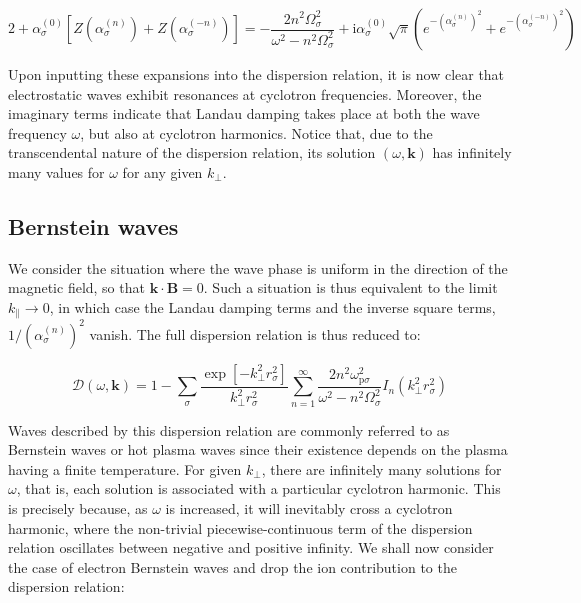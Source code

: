 \begin{equation}
    2+\alpha_\sigma^{(0)}\left[Z\left(\alpha_\sigma^{(n)}\right)+Z\left(\alpha_\sigma^{(-n)}\right)\right]=-\frac{2n^2\Omega_\sigma^2}{\omega^2-n^2\Omega_\sigma^2}+\mathrm{i}\alpha_\sigma^{(0)}\sqrt{\pi}\left(e^{-\left(\alpha_\sigma^{(n)}\right)^2}+e^{-\left(\alpha_\sigma^{(-n)}\right)^2}\right)
\end{equation}

Upon inputting these expansions into the dispersion relation, it is now clear that electrostatic waves exhibit resonances at cyclotron frequencies. Moreover, the imaginary terms indicate that Landau damping takes place at both the wave frequency $\omega$, but also at cyclotron harmonics. Notice that, due to the transcendental nature of the dispersion relation, its solution $(\omega,\mathbf{k})$ has infinitely many values for $\omega$ for any given $k_\perp$.

\subsection{Bernstein waves}

We consider the situation where the wave phase is uniform in the direction of the magnetic field, so that $\mathbf{k}\cdot\mathbf{B}=0$. Such a situation is thus equivalent to the limit $k_\parallel\to0$, in which case the Landau damping terms and the inverse square terms, $1/(\alpha_\sigma^{(n)})^2$ vanish. The full dispersion relation is thus reduced to:

\begin{equation}
    \mathcal{D}(\omega,\mathbf{k})=1-\sum_{\sigma}\frac{\exp{\left[-k_\perp^2r_\sigma^2\right]}}{k_\perp^2r_\sigma^2}\sum_{n=1}^\infty\frac{2n^2\omega_{\mathrm{p}\sigma}^2}{\omega^2-n^2\Omega_\sigma^2}I_n(k_\perp^2r_\sigma^2)
\end{equation}

Waves described by this dispersion relation are commonly referred to as Bernstein waves or hot plasma waves since their existence depends on the plasma having a finite temperature. For given $k_\perp$, there are infinitely many solutions for $\omega$, that is, each solution is associated with a particular cyclotron harmonic. This is precisely because, as $\omega$ is increased, it will inevitably cross a cyclotron harmonic, where the non-trivial piecewise-continuous term of the dispersion relation oscillates between negative and positive infinity. We shall now consider the case of electron Bernstein waves and drop the ion contribution to the dispersion relation:

